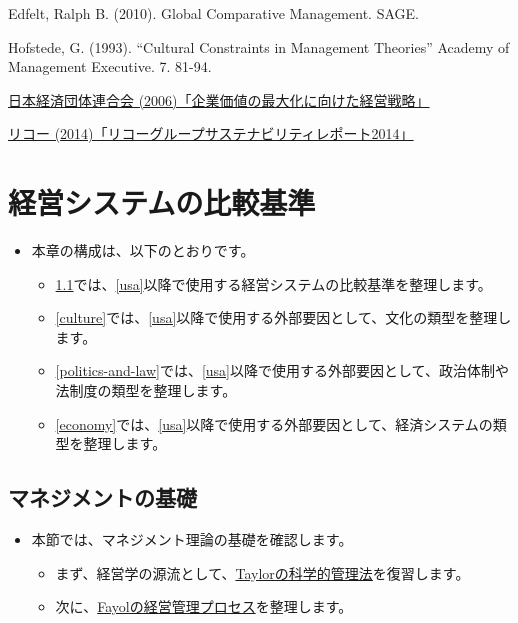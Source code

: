 \documentclass[
]{book}
\begin{document}
Edfelt, Ralph B. (2010). Global Comparative Management. SAGE.

Hofstede, G. (1993). ``Cultural Constraints in Management Theories'' Academy of Management Executive. 7. 81-94.

\href{https://www.keidanren.or.jp/japanese/policy/2006/010/}{日本経済団体連合会 (2006)「企業価値の最大化に向けた経営戦略」}

\href{https://jp.ricoh.com/environment/report/index2014.html}{リコー (2014)「リコーグループサステナビリティレポート2014」}

\hypertarget{management}{%
\chapter{経営システムの比較基準}\label{management}}

\begin{itemize}
\item
  本章の構成は、以下のとおりです。

  \begin{itemize}
  \item
    \ref{basics}では、\ref{usa}以降で使用する経営システムの比較基準を整理します。
  \item
    \ref{culture}では、\ref{usa}以降で使用する外部要因として、文化の類型を整理します。
  \item
    \ref{politics-and-law}では、\ref{usa}以降で使用する外部要因として、政治体制や法制度の類型を整理します。
  \item
    \ref{economy}では、\ref{usa}以降で使用する外部要因として、経済システムの類型を整理します。
  \end{itemize}
\end{itemize}

\hypertarget{basics}{%
\section{マネジメントの基礎}\label{basics}}

\begin{itemize}
\item
  本節では、マネジメント理論の基礎を確認します。

  \begin{itemize}
  \item
    まず、経営学の源流として、\protect\hyperlink{taylor}{Taylorの科学的管理法}を復習します。
  \item
    次に、\protect\hyperlink{fayol}{Fayolの経営管理プロセス}を整理します。
  \end{itemize}
\end{itemize}
\end{document}
